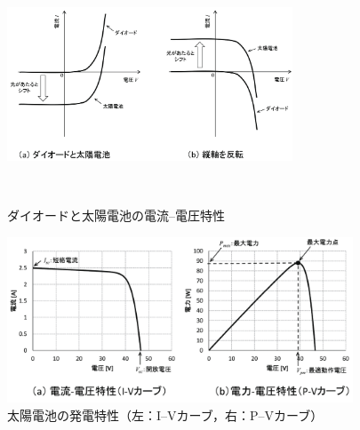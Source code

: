 \begin{figure}[htb]
	\centering
	\includegraphics[width=8.5cm]{./pdfs/fig5.pdf}
	\caption{ダイオードと太陽電池の電流--電圧特性}\
	\label{fig:fig5}
\end{figure}
\begin{figure}[htb]
	\centering
	\includegraphics[width=10.3cm]{./pdfs/fig6.pdf}
	\caption{太陽電池の発電特性（左：I--Vカーブ，右：P--Vカーブ）}
	\label{fig:fig6}
\end{figure}%
\clearpage
